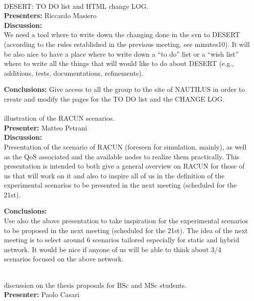 \documentclass[11pt,journal,draftclsnofoot,onecolumn,twoside,letterpaper]{IEEEtran}
\theoremstyle{definition} \newtheorem{definition}[]{Definition}
\theoremstyle{theorem} \newtheorem{theorem}[]{Theorem}
\begin{document}
\  \\

 DESERT: TO DO list and HTML change LOG.\\
{\bf Presenters:} Riccardo Masiero\\

{\bf Discussion:}\\
We need a tool where to write down the changing done in the svn to DESERT (according to the rules established in the previous meeting, see minutes10). It will be also nice to have a place where to write down a ``to do'' list or a ``wish list'' where to write all the things that will would like to do about DESERT (e.g., additions, tests, documentations, refinements).

{\bf Conclusions:}
Give access to all the group to the site of NAUTILUS in order to create and modify the pages for the TO DO list and the CHANGE LOG.\\

\  \\

 illustration of the RACUN scenarios.\\
{\bf Presenter:} Matteo Petrani\\

{\bf Discussion:}\\
Presentation of the scenario of RACUN (foreseen for simulation, mainly), as well as the QoS associated and the available nodes to realize them practically. This presentation is intended to both give a general overview on RACUN for those of us that will work on it and also to inspire all of us in the definition of the experimental scenarios to be presented in the next meeting (scheduled for the 21st).

{\bf Conclusions:}\\
Use also the above presentation to take inspiration for the experimental scenarios to be proposed in the next meeting (scheduled for the 21st). The idea of the next meeting is to select around 6 scenarios tailored especially for static and hybrid network. It would be nice if anyone of us will be able to think about 3/4 scenarios focused on the above network.

\  \\


 discussion on the thesis proposals for BSc and MSc students.\\
{\bf Presenter:} Paolo Casari\\
\end{document}
